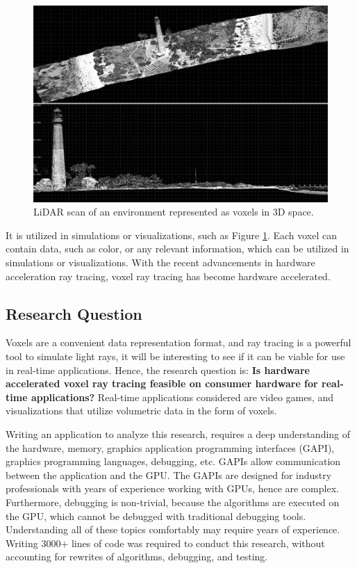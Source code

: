 \documentclass[12pt]{article}
\begin{document}
\begin{figure}[H]
    \begin{center}
        \includegraphics[scale=0.4]{LiDAR}
    \end{center}
    \caption{LiDAR scan of an environment represented as voxels in 3D space. \parencite{NOS:LiDAR}}
    \label{fig:LiDAR}
\end{figure}

It is utilized in simulations or visualizations, such as Figure \ref{fig:LiDAR}.
Each voxel can contain data, such as color, or any relevant information,
which can be utilized in simulations or visualizations. With the recent advancements in hardware acceleration
ray tracing, voxel ray tracing has become hardware accelerated. \parencite[Chapter~37]{NVIDIA:RTGems2}

\subsection{Research Question}

Voxels are a convenient data representation format, and ray tracing is a powerful tool to simulate light rays,
it will be interesting to see if it can be viable for use in real-time applications.
Hence, the research question is: {\bf Is hardware accelerated voxel ray tracing feasible on consumer hardware for real-time applications? }
Real-time applications considered are video games, and visualizations that utilize volumetric data in the form of voxels.

Writing an application to analyze this research, requires a deep understanding of the hardware, memory, graphics application programming interfaces (GAPI), graphics programming languages, debugging, etc.
GAPIs allow communication between the application and the GPU.
The GAPIs are designed for industry professionals with years of experience working with GPUs, hence are complex.
Furthermore, debugging is non-trivial, because the algorithms are executed on the GPU, which cannot be debugged with traditional debugging tools.
Understanding all of these topics comfortably may require years of experience. Writing 3000+ lines of code was required to conduct this research, without accounting for rewrites of algorithms, debugging, and testing.
\end{document}
